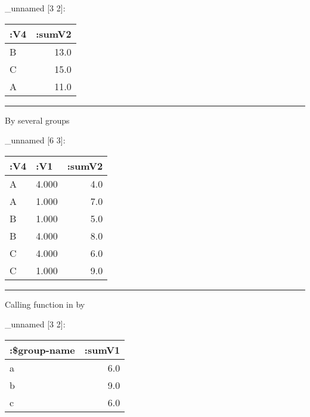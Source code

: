 \documentclass[]{article}
\newenvironment{Shaded}{\begin{snugshade}}{\end{snugshade}}
\newcommand{\KeywordTok}[1]{\textcolor[rgb]{0.13,0.29,0.53}{\textbf{#1}}}
\newcommand{\VariableTok}[1]{\textcolor[rgb]{0.00,0.00,0.00}{#1}}
\newcommand{\AttributeTok}[1]{\textcolor[rgb]{0.77,0.63,0.00}{#1}}
\newcommand{\NormalTok}[1]{#1}
\begin{document}
\_unnamed {[}3 2{]}:

\begin{longtable}[]{@{}lr@{}}
\toprule
:V4 & :sumV2\tabularnewline
\midrule
\endhead
B & 13.0\tabularnewline
C & 15.0\tabularnewline
A & 11.0\tabularnewline
\bottomrule
\end{longtable}

\begin{center}\rule{0.5\linewidth}{0.5pt}\end{center}

By several groups

\begin{Shaded}
\end{Shaded}

\_unnamed {[}6 3{]}:

\begin{longtable}[]{@{}llr@{}}
\toprule
:V4 & :V1 & :sumV2\tabularnewline
\midrule
\endhead
A & 4.000 & 4.0\tabularnewline
A & 1.000 & 7.0\tabularnewline
B & 1.000 & 5.0\tabularnewline
B & 4.000 & 8.0\tabularnewline
C & 4.000 & 6.0\tabularnewline
C & 1.000 & 9.0\tabularnewline
\bottomrule
\end{longtable}

\begin{center}\rule{0.5\linewidth}{0.5pt}\end{center}

Calling function in by

\begin{Shaded}
\end{Shaded}

\_unnamed {[}3 2{]}:

\begin{longtable}[]{@{}lr@{}}
\toprule
:\$group-name & :sumV1\tabularnewline
\midrule
\endhead
a & 6.0\tabularnewline
b & 9.0\tabularnewline
c & 6.0\tabularnewline
\bottomrule
\end{longtable}
\end{document}

